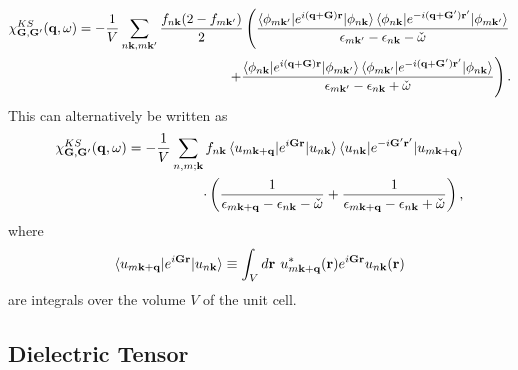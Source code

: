 \begin{refsection}
\begin{equation}
\begin{aligned}
\chi_{\mathbf{G},\mathbf{G}'}^{KS}(\mathbf{q},\omega) = - \frac{1}{V} \sum_{n\mathbf{k},m\mathbf{k}'} \frac{f_{n\mathbf{k}} (2-f_{m\mathbf{k}'})}{2} \left( \frac{\braket{\phi_{m\mathbf{k}'} | e^{i(\mathbf{q}+\mathbf{G})\mathbf{r}} |\phi_{n\mathbf{k}}}\braket{\phi_{n\mathbf{k}} | e^{-i(\mathbf{q}+\mathbf{G}')\mathbf{r}'} |\phi_{m\mathbf{k}'}}}{\epsilon_{m\mathbf{k}'} - \epsilon_{n\mathbf{k}} - \check{\omega}}\right. \\ \left. + \frac{\braket{\phi_{n\mathbf{k}} | e^{i(\mathbf{q}+\mathbf{G})\mathbf{r}} |\phi_{m\mathbf{k}'}}\braket{\phi_{m\mathbf{k}'} | e^{-i(\mathbf{q}+\mathbf{G}')\mathbf{r}'} |\phi_{n\mathbf{k}}}}{\epsilon_{m\mathbf{k}'} - \epsilon_{n\mathbf{k}} + \check{\omega}}\right).
\end{aligned}
\end{equation}
This can alternatively be written as~\cite{Harl2008}
\begin{equation}\label{eq:Fresponse}
\begin{aligned}
\chi_{\mathbf{G},\mathbf{G}'}^{KS}(\mathbf{q},\omega) = - \frac{1}{V} \sum_{n,m ; \mathbf{k}} f_{n\mathbf{k}} \braket{u_{m\mathbf{k+q}} | e^{i\mathbf{G}\mathbf{r}} | u_{n\mathbf{k}}} \braket{u_{n\mathbf{k}} | e^{-i\mathbf{G}'\mathbf{r}'} | u_{m\mathbf{k+q}}}\\ \cdot \left( \frac{1}{\epsilon_{m\mathbf{k+q}} - \epsilon_{n\mathbf{k}} - \check{\omega}} + \frac{1}{\epsilon_{m\mathbf{k+q}} - \epsilon_{n\mathbf{k}} + \check{\omega}}\right),
\end{aligned}
\vspace{0.2in}
\end{equation}
where
\begin{equation}
\braket{u_{m\mathbf{k+q}} | e^{i\mathbf{G}\mathbf{r}} | u_{n\mathbf{k}}} \equiv \int_V d\mathbf{r} \hspace{0.05in} u_{m\mathbf{k+q}}^*(\mathbf{r}) e^{i\mathbf{G}\mathbf{r}} u_{n\mathbf{k}}(\mathbf{r})
\end{equation}
are integrals over the volume $V$ of the unit cell.

\subsection{Dielectric Tensor} \label{dft:sec-dielectric}


\end{refsection}
